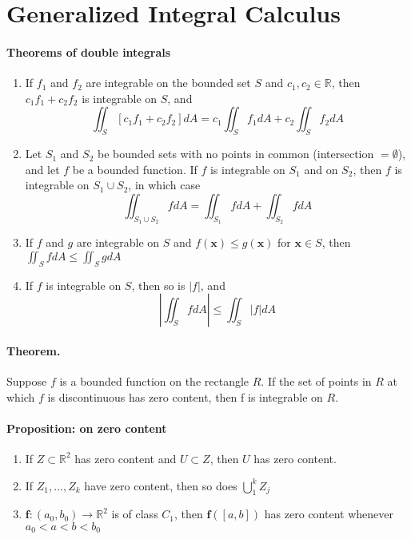\documentclass[11pt]{article}
\newcommand{\bx}[0]{\mathbf{x}}
\newcommand{\real}[0]{\mathbb{R}}
\begin{document}
\section{Generalized Integral Calculus}
\paragraph{Theorems of double integrals}
\begin{enumerate}
    \item If $f_1$ and $f_2$ are integrable on the bounded set $S$ and $c_1,c_2\in \real$, then $c_1f_1 + c_2f_2$ is integrable on $S$, and
    \begin{equation*}
        \iint_S[c_1f_1 + c_2f_2]dA = c_1\iint_Sf_1dA + c_2\iint_Sf_2dA
    \end{equation*}
    
    \item Let $S_1$ and $S_2$ be bounded sets with no points in common (intersection $ =\emptyset$), and let $f$ be a bounded function. If $f$ is integrable on $S_1$ and on $S_2$, then $f$ is integrable on $S_1\cup S_2$, in which case
    \begin{equation*}
        \iint_{S_1\cup S_2}fdA = \iint_{S_1}fdA + \iint_{S_2} fdA
    \end{equation*}
    
    \item If $f$ and $g$ are integrable on $S$ and $f(\mathbf{x})\leq g(\mathbf{x})$ for $\bx \in S$, then $\iint_S fdA \leq \iint_S g dA$
    
    \item If $f$ is integrable on $S$, then so is $|f|$, and
    \begin{equation*}
        \left|\iint_Sf dA\right| \leq \iint_S|f|dA
    \end{equation*}
\end{enumerate}

\paragraph{Theorem.} Suppose $f$ is a bounded function on the rectangle $R$. If the set of points in $R$ at which $f$ is discontinuous has zero content, then f is integrable on $R$.

\paragraph{Proposition: on zero content} 
\begin{enumerate}
    \item If $Z\subset \real^2$ has zero content and $U\subset Z$, then $U$ has zero content.
    \item If $Z_1,...,Z_k$ have zero content, then so does $\bigcup_1^k Z_j$
    \item $\mathbf{f}:(a_0, b_0) \xrightarrow{} \real^2$ is of class $C_1$, then $\mathbf{f}([a,b])$ has zero content whenever $a_0<a<b<b_0$
\end{enumerate}
\end{document}
